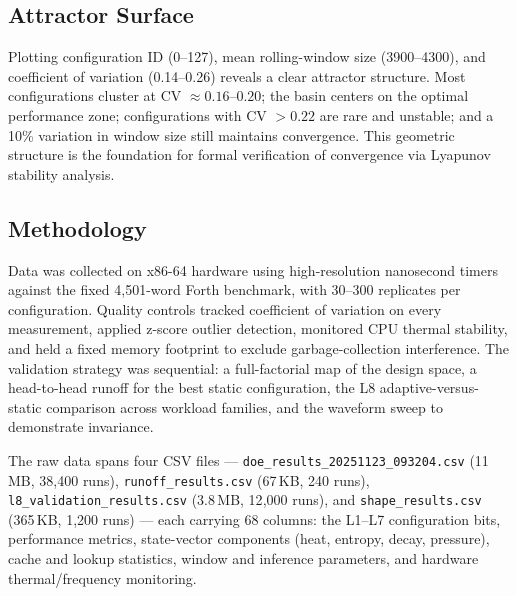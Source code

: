 \subsection{Attractor Surface}

Plotting configuration ID (0--127), mean rolling-window size (3900--4300), and
coefficient of variation (0.14--0.26) reveals a clear attractor structure. Most
configurations cluster at CV $\approx 0.16$--$0.20$; the basin centers on the
optimal performance zone; configurations with CV $> 0.22$ are rare and unstable;
and a 10\% variation in window size still maintains convergence. This geometric
structure is the foundation for formal verification of convergence via Lyapunov
stability analysis.

\subsection{Methodology}

Data was collected on x86-64 hardware using high-resolution nanosecond timers
against the fixed 4{,}501-word Forth benchmark, with 30--300 replicates per
configuration. Quality controls tracked coefficient of variation on every
measurement, applied z-score outlier detection, monitored CPU thermal stability,
and held a fixed memory footprint to exclude garbage-collection interference. The
validation strategy was sequential: a full-factorial map of the design space, a
head-to-head runoff for the best static configuration, the L8 adaptive-versus-
static comparison across workload families, and the waveform sweep to demonstrate
invariance.

The raw data spans four CSV files ---
\texttt{doe\_results\_20251123\_093204.csv} (11\,MB, 38{,}400 runs),
\texttt{runoff\_results.csv} (67\,KB, 240 runs),
\texttt{l8\_validation\_results.csv} (3.8\,MB, 12{,}000 runs), and
\texttt{shape\_results.csv} (365\,KB, 1{,}200 runs) --- each carrying 68 columns:
the L1--L7 configuration bits, performance metrics, state-vector components (heat,
entropy, decay, pressure), cache and lookup statistics, window and inference
parameters, and hardware thermal/frequency monitoring.

